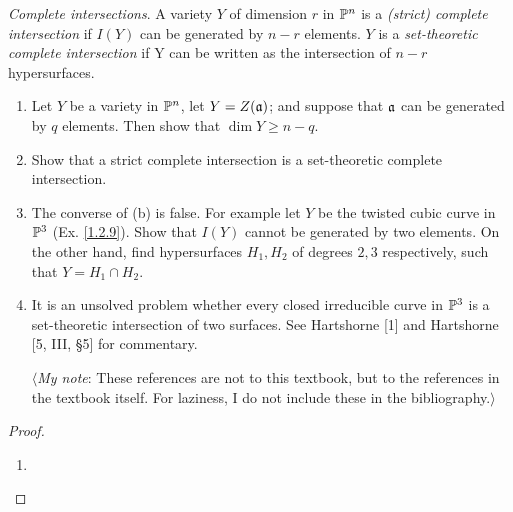 \label{1.2.17}

\textit{Complete intersections}. A variety $Y$ of dimension $r$ in $\P^n$ is a \textit{(strict) complete intersection} if $I(Y)$ can be generated by $n - r$ elements. $Y$ is a \textit{set-theoretic complete intersection} if Y can be written as the intersection of $n - r$ hypersurfaces.

\begin{enumerate}[label = (\alph*)]
    \item Let $Y$ be a variety in $\P^n$, let $Y = Z(\a)$; and suppose that $\a$ can be generated by $q$ elements. Then show that $\dim Y \geq n - q$.
    
    \item Show that a strict complete intersection is a set-theoretic complete intersection.
    
    \item The converse of (b) is false. For example let $Y$ be the twisted cubic curve in $\P^3$ (Ex. \ref{1.2.9}). Show that $I(Y)$ cannot be generated by two elements. On the other hand, find hypersurfaces $H_1, H_2$ of degrees $2, 3$ respectively, such that $Y = H_1 \cap H_2$.
    
    \item It is an unsolved problem whether every closed irreducible curve in $\P^3$ is a set-theoretic intersection of two surfaces. See Hartshorne [1] and Hartshorne [5, III, §5] for commentary.
    
    $\langle$\textit{My note}: These references are not to this textbook, but to the references in the textbook itself. For laziness, I do not include these in the bibliography.$\rangle$
\end{enumerate}

\begin{proof}
    \begin{enumerate}[label = (\alph*)]
        \item 
    \end{enumerate}
\end{proof}
